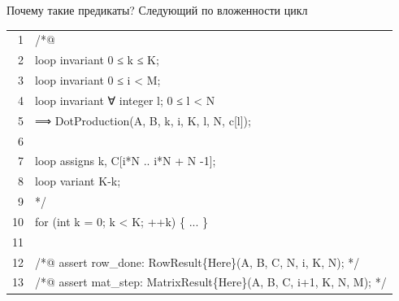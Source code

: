 \documentclass[aspectratio=169, 11pt]{beamer}
\newcommand{\AK}[1]{\textcolor{acslkw}{#1}}   %
\newcommand{\AT}[1]{\textcolor{acslty}{#1}}   %
\newcommand{\AQ}[1]{\textcolor{acslqu}{#1}}   %
\newcommand{\AI}[1]{\textcolor{acslid}{#1}}   %
\newcommand{\AN}[1]{\textcolor{acslnm}{#1}}   %
\newcommand{\AL}[1]{\textcolor{acsllg}{#1}}   %
\newcommand{\AC}[1]{\textcolor{acslcm}{#1}}   %
\newcommand{\ALB}[1]{\textcolor{acsllb}{#1}}  %
\begin{document}
\begin{frame}[fragile]{Почему такие предикаты? Следующий по вложенности цикл}
	\ttfamily\small
	\setlength{\baselineskip}{1.15em}
	\setlength{\parindent}{0pt}
	
	\begingroup
	\setlength{\fboxsep}{0pt}%
	\colorbox{codebg}{%
		\begin{minipage}{\linewidth}
			\vspace{6pt}%
			\hspace{8pt}%
			\begin{tabular}{@{}r@{\hspace{1.2em}}l@{}}
				\textcolor{ln}{1} & \AC{/*@} \\
				\textcolor{ln}{2} & \hspace{2em}\AK{loop invariant} \AN{0} \AL{≤} \AI{k} \AL{≤} \AI{K}; \\
				\textcolor{ln}{3} & \hspace{2em}\AK{loop invariant} \AN{0} \AL{≤} \AI{i} \AL{<} \AI{M}; \\
				\textcolor{ln}{4} & \hspace{2em}\AK{loop invariant} \AQ{∀} \AT{integer} \AI{l}; \AN{0} \AL{≤} \AI{l} \AL{<} \AI{N} \\
				\textcolor{ln}{5} & \hspace{4em}\AL{⟹} \AI{DotProduction}(\AI{A}, \AI{B}, \AI{k}, \AI{i}, \AI{K}, \AI{l}, \AI{N}, \AI{c}[\AI{l}]); \\
				\textcolor{ln}{6} & \\
				\textcolor{ln}{7} & \hspace{2em}\AK{loop assigns} \AI{k}, \AI{C}[\AI{i}\AI{*}\AI{N} \AL{..} \AI{i}\AI{*}\AI{N} \AL{+} \AI{N} \AN{-1}]; \\
				\textcolor{ln}{8} & \hspace{2em}\AK{loop variant} \AI{K}\AN{-}\AI{k}; \\
				\textcolor{ln}{9} & \AC{*/} \\
				\textcolor{ln}{10} & \AK{for} (\AT{int} \AI{k} \AL{=} \AN{0}; \AI{k} \AL{<} \AI{K}; \AL{++}\AI{k}) \{ \AC{...} \} \\
				\textcolor{ln}{11} & \\
				\textcolor{ln}{12} & \AC{/*@} \AK{assert} \AI{row\_done}: \AI{RowResult}\{\ALB{Here}\}(\AI{A}, \AI{B}, \AI{C}, \AI{N}, \AI{i}, \AI{K}, \AI{N}); \AC{*/} \\
				\textcolor{ln}{13} & \AC{/*@} \AK{assert} \AI{mat\_step}: \AI{MatrixResult}\{\ALB{Here}\}(\AI{A}, \AI{B}, \AI{C}, \AI{i}\AN{+1}, \AI{K}, \AI{N}, \AI{M}); \AC{*/} \\
			\end{tabular}
			\hspace{8pt}%
			\vspace{4pt}%
		\end{minipage}%
	}%
	\endgroup
\end{frame}
\end{document}
